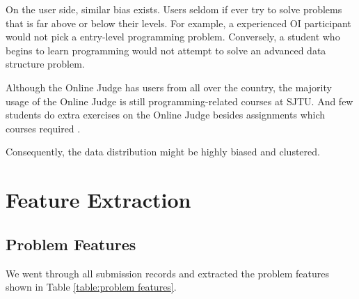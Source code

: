     On the user side, similar bias exists.
    Users seldom if ever try to solve problems that is far above or below their levels.
    For example, a experienced OI participant would not pick a entry-level programming problem.
    Conversely, a student who begins to learn programming would not
    attempt to solve an advanced data structure problem.

    Although the Online Judge has users from all over the country,
    the majority usage of the Online Judge is still programming-related courses at SJTU.
    And few students do extra exercises on the Online Judge besides assignments which courses required .

    Consequently, the data distribution might be highly biased and clustered.

\section{Feature Extraction}


    \subsection{Problem Features}

        We went through all submission records and extracted the problem features shown in Table \ref{table:problem features}.


